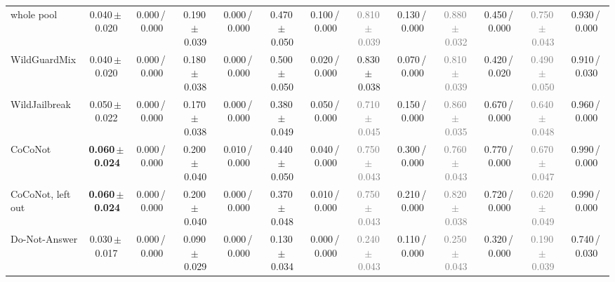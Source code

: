 \begin{tabular}{@{}lcccccccccccc@{}}
whole pool & 0.040\,{\scriptsize$\pm$\,0.020} & {\scriptsize 0.000\,/\,0.000} & 0.190\,{\scriptsize$\pm$\,0.039} & {\scriptsize 0.000\,/\,0.000} & 0.470\,{\scriptsize$\pm$\,0.050} & {\scriptsize 0.100\,/\,0.000} & \textcolor{gray}{0.810\,{\scriptsize$\pm$\,0.039}} & {\scriptsize 0.130\,/\,0.000} & \textcolor{gray}{0.880\,{\scriptsize$\pm$\,0.032}} & {\scriptsize 0.450\,/\,0.000} & \textcolor{gray}{0.750\,{\scriptsize$\pm$\,0.043}} & {\scriptsize 0.930\,/\,0.000} \\
WildGuardMix & 0.040\,{\scriptsize$\pm$\,0.020} & {\scriptsize 0.000\,/\,0.000} & 0.180\,{\scriptsize$\pm$\,0.038} & {\scriptsize 0.000\,/\,0.000} & 0.500\,{\scriptsize$\pm$\,0.050} & {\scriptsize 0.020\,/\,0.000} & 0.830\,{\scriptsize$\pm$\,0.038} & {\scriptsize 0.070\,/\,0.000} & \textcolor{gray}{0.810\,{\scriptsize$\pm$\,0.039}} & {\scriptsize 0.420\,/\,0.020} & \textcolor{gray}{0.490\,{\scriptsize$\pm$\,0.050}} & {\scriptsize 0.910\,/\,0.030} \\
WildJailbreak & 0.050\,{\scriptsize$\pm$\,0.022} & {\scriptsize 0.000\,/\,0.000} & 0.170\,{\scriptsize$\pm$\,0.038} & {\scriptsize 0.000\,/\,0.000} & 0.380\,{\scriptsize$\pm$\,0.049} & {\scriptsize 0.050\,/\,0.000} & \textcolor{gray}{0.710\,{\scriptsize$\pm$\,0.045}} & {\scriptsize 0.150\,/\,0.000} & \textcolor{gray}{0.860\,{\scriptsize$\pm$\,0.035}} & {\scriptsize 0.670\,/\,0.000} & \textcolor{gray}{0.640\,{\scriptsize$\pm$\,0.048}} & {\scriptsize 0.960\,/\,0.000} \\
CoCoNot & \textbf{0.060\,{\scriptsize$\pm$\,0.024}} & {\scriptsize 0.000\,/\,0.000} & 0.200\,{\scriptsize$\pm$\,0.040} & {\scriptsize 0.010\,/\,0.000} & 0.440\,{\scriptsize$\pm$\,0.050} & {\scriptsize 0.040\,/\,0.000} & \textcolor{gray}{0.750\,{\scriptsize$\pm$\,0.043}} & {\scriptsize 0.300\,/\,0.000} & \textcolor{gray}{0.760\,{\scriptsize$\pm$\,0.043}} & {\scriptsize 0.770\,/\,0.000} & \textcolor{gray}{0.670\,{\scriptsize$\pm$\,0.047}} & {\scriptsize 0.990\,/\,0.000} \\
CoCoNot, left out & \textbf{0.060\,{\scriptsize$\pm$\,0.024}} & {\scriptsize 0.000\,/\,0.000} & 0.200\,{\scriptsize$\pm$\,0.040} & {\scriptsize 0.000\,/\,0.000} & 0.370\,{\scriptsize$\pm$\,0.048} & {\scriptsize 0.010\,/\,0.000} & \textcolor{gray}{0.750\,{\scriptsize$\pm$\,0.043}} & {\scriptsize 0.210\,/\,0.000} & \textcolor{gray}{0.820\,{\scriptsize$\pm$\,0.038}} & {\scriptsize 0.720\,/\,0.000} & \textcolor{gray}{0.620\,{\scriptsize$\pm$\,0.049}} & {\scriptsize 0.990\,/\,0.000} \\
Do-Not-Answer & 0.030\,{\scriptsize$\pm$\,0.017} & {\scriptsize 0.000\,/\,0.000} & 0.090\,{\scriptsize$\pm$\,0.029} & {\scriptsize 0.000\,/\,0.000} & 0.130\,{\scriptsize$\pm$\,0.034} & {\scriptsize 0.000\,/\,0.000} & \textcolor{gray}{0.240\,{\scriptsize$\pm$\,0.043}} & {\scriptsize 0.110\,/\,0.000} & \textcolor{gray}{0.250\,{\scriptsize$\pm$\,0.043}} & {\scriptsize 0.320\,/\,0.000} & \textcolor{gray}{0.190\,{\scriptsize$\pm$\,0.039}} & {\scriptsize 0.740\,/\,0.030} \\

\end{tabular}

